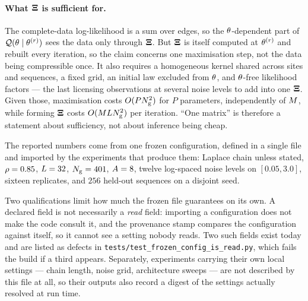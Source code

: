

\paragraph{What $\mathbf{\Xi}$ is sufficient for.} The complete-data log-likelihood is a sum over edges, so
the $\theta$-dependent part of $\mathcal{Q}(\theta\mid\theta^{(r)})$ sees the data only through
$\mathbf{\Xi}$. But $\mathbf{\Xi}$ is itself computed at $\theta^{(r)}$ and rebuilt every iteration, so the claim
concerns one maximisation step, not the data being compressible once. It also requires a
homogeneous kernel shared across sites and sequences, a fixed grid, an initial law excluded from
$\theta$, and $\theta$-free likelihood factors --- the last licensing observations at several
noise levels to add into one $\mathbf{\Xi}$. Given those, maximisation costs $O(PN_{\mathrm{g}}^2)$ for $P$
parameters, independently of $M$, while forming $\mathbf{\Xi}$ costs $O(MLN_{\mathrm{g}}^2)$ per
iteration. ``One matrix'' is therefore a statement about sufficiency, not about inference being
cheap.

The reported numbers come from one frozen configuration, defined in a single file and imported by
the experiments that produce them: Laplace chain unless stated, $\rho=0.85$, $L=32$,
$N_{\mathrm{g}}=401$, $A=8$, twelve log-spaced noise levels on $[0.05,3.0]$, sixteen replicates,
and $256$ held-out sequences on a disjoint seed.

Two qualifications limit how much the frozen file guarantees on its own. A declared field is not
necessarily a \emph{read} field: importing a configuration does not make the code consult it, and
the provenance stamp compares the configuration against itself, so it cannot see a setting nobody
reads. Two such fields exist today and are listed as defects in
\texttt{tests/test\_frozen\_config\_is\_read.py}, which fails the build if a third appears.
Separately, experiments carrying their own local settings --- chain length, noise grid,
architecture sweeps --- are not described by this file at all, so their outputs also record
a digest of the settings actually resolved at run time.

